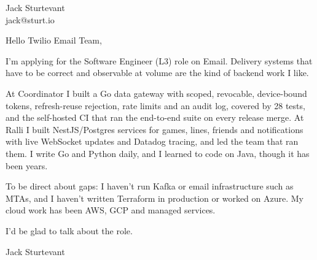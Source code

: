 \documentclass[11pt]{article}
\begin{document}
\raggedright

{\namefont\fontsize{20pt}{24pt}\selectfont Jack Sturtevant}\\[-0.3em]
jack@sturt.io

\vspace{1.2em}

Hello Twilio Email Team,

I'm applying for the Software Engineer (L3) role on Email. Delivery systems that have to be correct and observable at volume are the kind of backend work I like.

At Coordinator I built a Go data gateway with scoped, revocable, device-bound tokens, refresh-reuse rejection, rate limits and an audit log, covered by 28 tests, and the self-hosted CI that ran the end-to-end suite on every release merge. At Ralli I built NestJS/Postgres services for games, lines, friends and notifications with live WebSocket updates and Datadog tracing, and led the team that ran them. I write Go and Python daily, and I learned to code on Java, though it has been years.

To be direct about gaps: I haven't run Kafka or email infrastructure such as MTAs, and I haven't written Terraform in production or worked on Azure. My cloud work has been AWS, GCP and managed services.

I'd be glad to talk about the role.

\vspace{0.6em}
Jack Sturtevant
\end{document}
